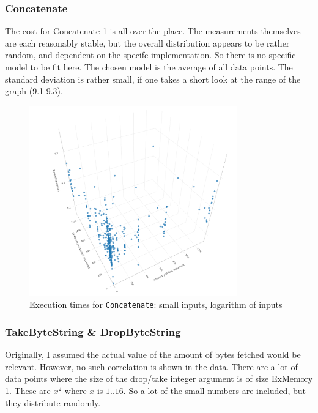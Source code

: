 \documentclass[a4paper]{article}
\begin{document}
\subsubsection*{Concatenate}

The cost for Concatenate \ref{fig:Concatenate} is all over the place. The
measurements themselves are each reasonably stable, but the overall distribution
appears to be rather random, and dependent on the specifc implementation. So
there is no specific model to be fit here. The chosen model is the average of
all data points. The standard deviation is rather small, if one takes a short
look at the range of the graph (9.1-9.3).

\begin{figure}
\centering
  \includegraphics[width=0.8\textwidth]{figures/Concatenate.png}
  \caption{Execution times for \texttt{Concatenate}: small inputs, logarithm of inputs}
  \label{fig:Concatenate}
\end{figure}

\subsubsection*{TakeByteString \& DropByteString}

Originally, I assumed the actual value of the amount of bytes fetched would be
relevant. However, no such correlation is shown in the data. There are a lot of
data points where the size of the drop/take integer argument is of size ExMemory
1. These are $x^2$ where $x$ is $1..16$. So a lot of the small numbers are
included, but they distribute randomly.
\end{document}
